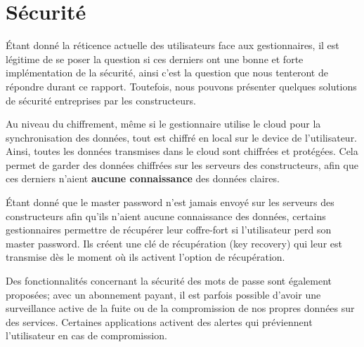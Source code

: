 \section{Sécurité}

Étant donné la réticence actuelle des utilisateurs face aux gestionnaires, il est légitime de se poser la question si ces derniers ont une bonne et forte implémentation de la sécurité, ainsi c'est la question que nous tenteront de répondre durant ce rapport. Toutefois, nous pouvons présenter quelques solutions de sécurité entreprises par les constructeurs. 

Au niveau du chiffrement, même si le gestionnaire utilise le cloud pour la synchronisation des données, tout est chiffré en local sur le device de l'utilisateur. Ainsi, toutes les données transmises dans le cloud sont chiffrées et protégées. Cela permet de garder des données chiffrées sur les serveurs des constructeurs, afin que ces derniers n'aient \textbf{aucune connaissance} des données claires. 

Étant donné que le master password n'est jamais envoyé sur les serveurs des constructeurs afin qu'ils n'aient aucune connaissance des données, certains gestionnaires permettre de récupérer leur coffre-fort si l'utilisateur perd son master password. Ils créent une clé de récupération (key recovery) qui leur est transmise dès le moment où ils activent l'option de récupération. 

Des fonctionnalités concernant la sécurité des mots de passe sont également proposées; avec un abonnement payant, il est parfois possible d'avoir une surveillance active de la fuite ou de la compromission de nos propres données sur des services. Certaines applications activent des alertes qui préviennent l'utilisateur en cas de compromission. 
